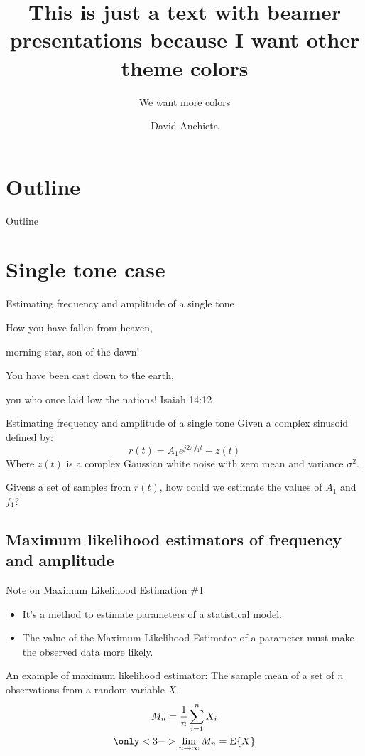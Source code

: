 ﻿\documentclass[mathserif]{beamer}
\title[Beamer themes] %
{\textbf{This is just a text with beamer presentations because I want other theme colors}}
\subtitle{We want more colors}
\author{David Anchieta}
\begin{document}
	\frame{\titlepage}

	\section*{Outline}
	\begin{frame}{Outline}		
		\tableofcontents
	\end{frame}
	
	\section{Single tone case}
	\begin{frame}{Estimating frequency and amplitude of a single tone}
		\begin{theorem}
			How you have fallen from heaven,
			
			morning star, son of the dawn!
			
		You have been cast down to the earth,

			you who once laid low the nations!
			Isaiah 14:12
		\end{theorem}
		
	\end{frame}\begin{frame}{Estimating frequency and amplitude of a single tone}
		Given a complex sinusoid defined by:
		\begin{equation*}
			r(t) = A_{1}e^{j2\pi f_1 t} + z(t)
		\end{equation*}
		Where $z(t)$ is a complex Gaussian white noise with zero mean and variance $\sigma^2$.
		
		Givens a set of samples from $r(t)$, how could we estimate the values of $A_1$ and $f_1$?	
		
	\end{frame}
	
	
	\subsection{Maximum likelihood estimators of frequency and amplitude}
	
	\begin{frame}{Note on Maximum Likelihood Estimation \#1}
		\begin{itemize}
			\item It's a method to estimate parameters of a statistical model.
			\item The value of the Maximum Likelihood Estimator of a parameter must make the observed data more likely.
		\end{itemize}
		\pause
		An example of maximum likelihood estimator: The sample mean of a set of $n$ observations from a random variable $X$.
		\begin{gather*}
			M_n = \frac{1}{n}\sum_{i=1}^nX_i\\
			\only<3->{ \lim_{n \to \infty}M_n = \mathrm{E}\{X\}}
		\end{gather*}
	\end{frame}
	
\end{document}

